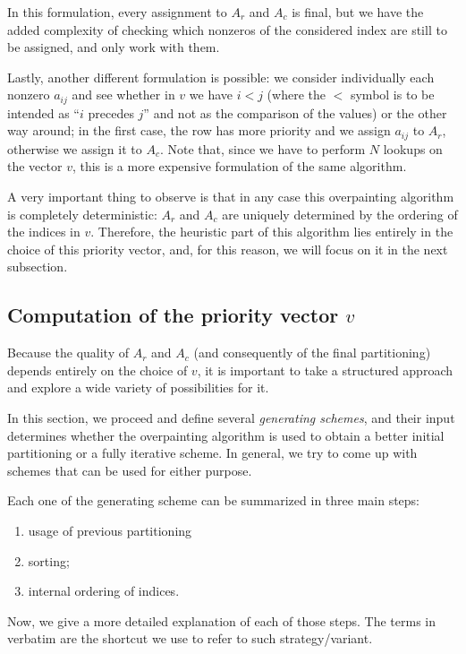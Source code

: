 In this formulation, every assignment to $A_r$ and $A_c$ is final, but we have the added complexity of checking which nonzeros of the considered index are still to be assigned, and only work with them.

Lastly, another different formulation is possible: we consider individually each nonzero $a_{ij}$ and see whether in $v$ we have $i < j$ (where the $<$ symbol is to be intended as ``$i$ precedes $j$'' and not as the comparison of the values) or the other way around; in the first case, the row has more priority and we assign $a_{ij}$ to $A_r$, otherwise we assign it to $A_c$. Note that, since we have to perform $N$ lookups on the vector $v$, this is a more expensive formulation of the same algorithm.

A very important thing to observe is that in any case this overpainting algorithm is completely deterministic: $A_r$ and $A_c$ are uniquely determined by the ordering of the indices in $v$. Therefore, the heuristic part of this algorithm lies entirely in the choice of this priority vector, and, for this reason, we will focus on it in the next subsection. 

\subsection{Computation of the priority vector $v$}

Because the quality of $A_r$ and $A_c$ (and consequently of the final partitioning) depends entirely on the choice of $v$, it is important to take a structured approach and explore a wide variety of possibilities for it.

In this section, we proceed and define several \emph{generating schemes}, and their input determines whether the overpainting algorithm is used to obtain a better initial partitioning or a fully iterative scheme. In general, we try to come up with schemes that can be used for either purpose. 

Each one of the generating scheme can be summarized in three main steps:

\begin{enumerate}
	\item usage of previous partitioning
	\item sorting;
	\item internal ordering of indices.
\end{enumerate}

Now, we give a more detailed explanation of each of those steps. The terms in verbatim are the shortcut we use to refer to such strategy/variant.

